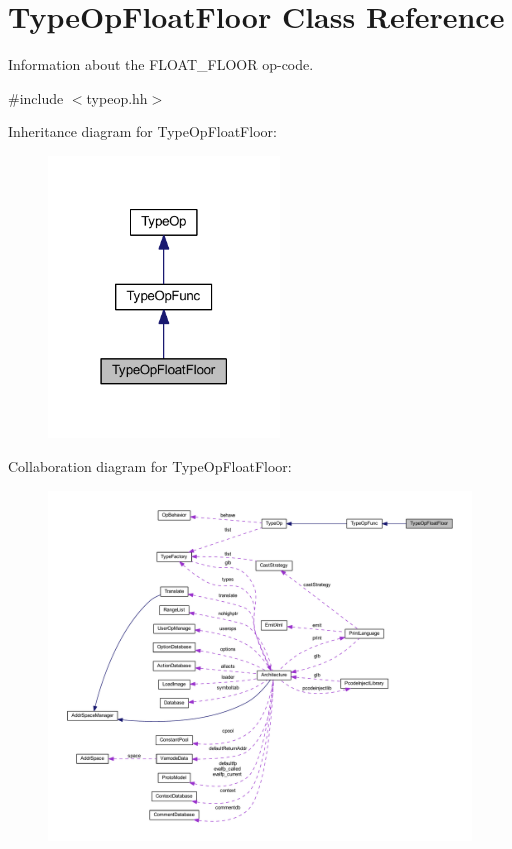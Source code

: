 \hypertarget{class_type_op_float_floor}{}\section{Type\+Op\+Float\+Floor Class Reference}
\label{class_type_op_float_floor}


Information about the F\+L\+O\+A\+T\+\_\+\+F\+L\+O\+OR op-\/code.  




{\ttfamily \#include $<$typeop.\+hh$>$}



Inheritance diagram for Type\+Op\+Float\+Floor\+:
\nopagebreak
\begin{figure}[H]
\begin{center}
\leavevmode
\includegraphics[width=174pt]{class_type_op_float_floor__inherit__graph}
\end{center}
\end{figure}


Collaboration diagram for Type\+Op\+Float\+Floor\+:
\nopagebreak
\begin{figure}[H]
\begin{center}
\leavevmode
\includegraphics[width=350pt]{class_type_op_float_floor__coll__graph}
\end{center}
\end{figure}
